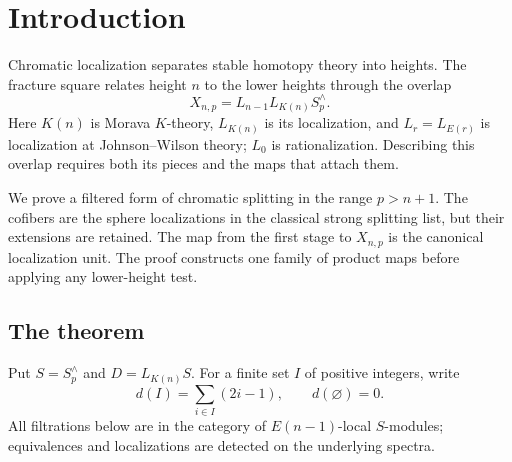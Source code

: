 \section{Introduction}
\label{sec:introduction}

Chromatic localization separates stable homotopy theory into heights.
The fracture square relates height \(n\) to the lower heights through
the overlap
\[
 X_{n,p}=L_{n-1}L_{K(n)}S_p^\wedge.
\]
Here \(K(n)\) is Morava \(K\)-theory, \(L_{K(n)}\) is its localization,
and \(L_r=L_{E(r)}\) is localization at Johnson--Wilson theory;
\(L_0\) is rationalization. Describing this overlap requires both its
pieces and the maps that attach them.

We prove a filtered form of chromatic splitting in the range
\(p>n+1\). The cofibers are the sphere localizations in the classical
strong splitting list, but their extensions are retained. The map
from the first stage to \(X_{n,p}\) is the canonical localization unit.
The proof constructs
one family of product maps before applying any lower-height test.

\subsection{The theorem}

Put \(S=S_p^\wedge\) and \(D=L_{K(n)}S\). For a finite set \(I\) of
positive integers, write
\[
 d(I)=\sum_{i\in I}(2i-1),\qquad d(\varnothing)=0.
\]
All filtrations below are in the category of \(E(n-1)\)-local
\(S\)-modules; equivalences and localizations are detected on the
underlying spectra.

